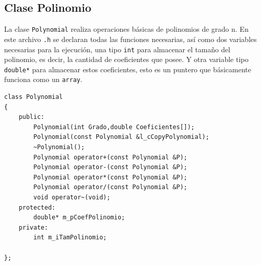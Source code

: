 \subsection{Clase Polinomio}

La clase \texttt{Polynomial} realiza operaciones básicas de polinomios de grado n. En este archivo \texttt{.h} se declaran todas las funciones necesarias, así como dos variables necesarias para la ejecución, una tipo \texttt{int} para almacenar el tamaño del polinomio, es decir, la cantidad de coeficientes que posee. Y otra variable tipo \texttt{double*} para almacenar estos coeficientes, esto es un puntero que básicamente funciona como un \texttt{array}.

\begin{verbatim}
class Polynomial
{
	public:
		Polynomial(int Grado,double Coeficientes[]);
		Polynomial(const Polynomial &l_cCopyPolynomial);
		~Polynomial();
		Polynomial operator+(const Polynomial &P);
		Polynomial operator-(const Polynomial &P);
		Polynomial operator*(const Polynomial &P);
		Polynomial operator/(const Polynomial &P);
		void operator~(void);
	protected:
		double* m_pCoefPolinomio;
	private:
		int m_iTamPolinomio;

};

\end{verbatim}

